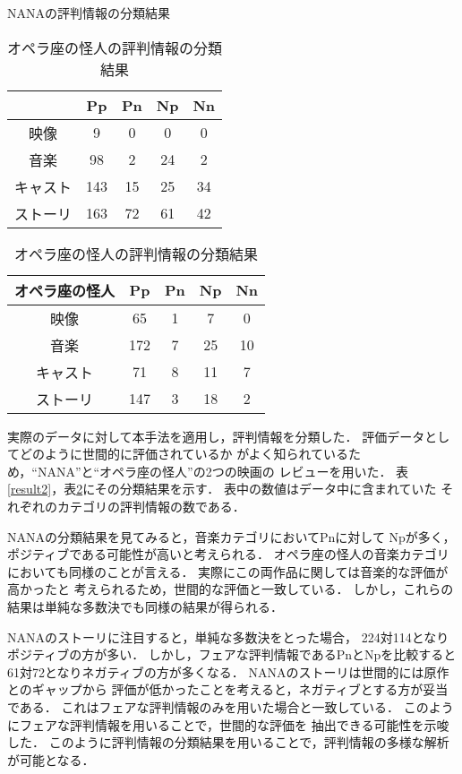 \documentclass[japanese]{jnlp_1.3c}
\begin{document}
\begin{table}[b]
\begin{minipage}{0.45\textwidth}
\caption{NANAの評判情報の分類結果}
\label{result2}
\begin{center}
\begin{tabular}{|c|c|c|c|c|} \hline
  & Pp & Pn & Np & Nn \\ \hline
映像 & 9 & 0 & 0 & 0 \\ \hline
音楽  & 98 & 2 & 24 & 2 \\ \hline
キャスト  & 143 & 15 & 25 & 34 \\ \hline
ストーリ  & 163 & 72 & 61 & 42 \\ \hline
\end{tabular}  
\end{center}
\end{minipage}
\hfill
\begin{minipage}{0.45\textwidth}
\caption{オペラ座の怪人の評判情報の分類結果}
\label{result3}
\begin{center}
\begin{tabular}{|c|c|c|c|c|} \hline
オペラ座の怪人  & Pp & Pn & Np & Nn \\ \hline
映像 & 65 & 1 & 7 & 0 \\ \hline
音楽  & 172 & 7 & 25 & 10 \\ \hline
キャスト  & 71 & 8 & 11 & 7 \\ \hline
ストーリ  & 147 & 3 & 18 & 2 \\ \hline
\end{tabular}
\end{center}
\end{minipage}
\end{table}

実際のデータに対して本手法を適用し，評判情報を分類した．
評価データとしてどのように世間的に評価されているか
がよく知られているため，``NANA''と``オペラ座の怪人''の2つの映画の
レビューを用いた．
表\ref{result2}，表\ref{result3}にその分類結果を示す．
表中の数値はデータ中に含まれていた
それぞれのカテゴリの評判情報の数である．

NANAの分類結果を見てみると，音楽カテゴリにおいてPnに対して
Npが多く，ポジティブである可能性が高いと考えられる．
オペラ座の怪人の音楽カテゴリにおいても同様のことが言える．
実際にこの両作品に関しては音楽的な評価が高かったと
考えられるため，世間的な評価と一致している．
しかし，これらの結果は単純な多数決でも同様の結果が得られる．

NANAのストーリに注目すると，単純な多数決をとった場合，
224対114となりポジティブの方が多い．
しかし，フェアな評判情報であるPnとNpを比較すると
61対72となりネガティブの方が多くなる．
NANAのストーリは世間的には原作とのギャップから
評価が低かったことを考えると，ネガティブとする方が妥当である．
これはフェアな評判情報のみを用いた場合と一致している．
このようにフェアな評判情報を用いることで，世間的な評価を
抽出できる可能性を示唆した．
このように評判情報の分類結果を用いることで，評判情報の多様な解析が可能となる．
\end{document}
